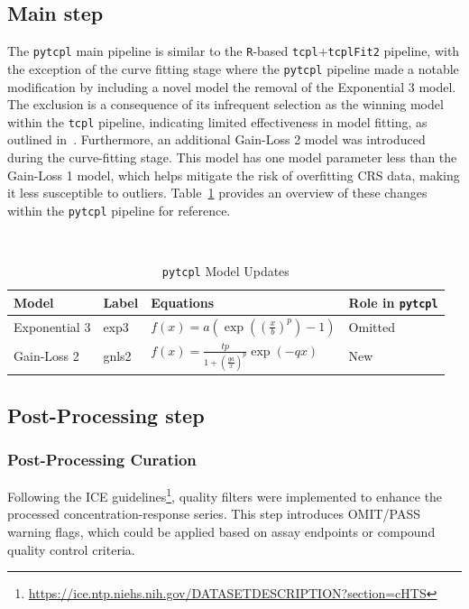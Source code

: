 \subsection{Main step}
The \texttt{pytcpl} main pipeline is similar to the \texttt{R}-based \texttt{tcpl}+\texttt{tcplFit2} pipeline, with the exception of the curve fitting stage where the \texttt{pytcpl} pipeline made a notable modification by including a novel model the removal of the Exponential 3 model. The exclusion is a consequence of its infrequent selection as the winning model within the \texttt{tcpl} pipeline, indicating limited effectiveness in model fitting, as outlined in~\cite{feshuk2023}. Furthermore, an additional Gain-Loss 2 model was introduced during the curve-fitting stage. This model has one model parameter less than the Gain-Loss 1 model, which helps mitigate the risk of overfitting CRS data, making it less susceptible to outliers. Table~\ref{table:pytcpl_models} provides an overview of these changes within the \texttt{pytcpl} pipeline for reference.

\begin{table}[h]
    \caption{\texttt{pytcpl} Model Updates}~\label{table:pytcpl_models}
    \centering
    \begin{threeparttable}[b]
    \begin{tabular}{llll}
    \toprule
    \textbf{Model} & \textbf{Label} & \textbf{Equations\tnote{1}} & \textbf{Role in} \texttt{pytcpl} \\
    \midrule
    Exponential 3 & exp3 & \(f(x) = a\left(\exp\left({\left(\frac{x}{b}\right)}^{p}\right) - 1\right)\) & Omitted \\
    Gain-Loss 2 & gnls2 & \(f(x) = \frac{tp}{1 + {\left(\frac{ga}{x}\right)}^{p}}\exp\left({-qx}\right)\) & New \\
    \bottomrule
    \end{tabular}
\end{threeparttable}
\end{table}

\subsection{Post-Processing step}
\subsubsection{Post-Processing Curation}
Following the ICE guidelines\footnote{\url{https://ice.ntp.niehs.nih.gov/DATASETDESCRIPTION?section=cHTS}}, quality filters were implemented to enhance the processed concentration-response series. This step introduces OMIT/PASS warning flags, which could be applied based on assay endpoints or compound quality control criteria.

